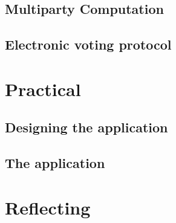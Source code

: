 \documentclass[a4paper]{report}
\theoremstyle{plain}
\begin{document}
\chapter{Multiparty Computation}
    
    
    
    
    
    
 \clearpage
\chapter{Electronic voting protocol}
    


\part{Practical}
\clearpage
\chapter{Designing the application} \label{chap:application}  
    
    
    
    
    
    
    
    
    
    
    
        
    
    
\clearpage
\chapter{The application}
    


\part{Reflecting}    
\clearpage    
\end{document}
